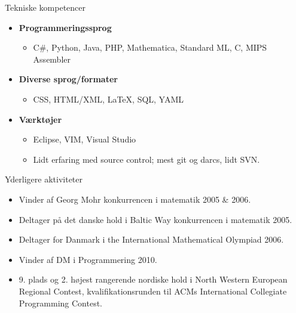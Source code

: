 \documentclass[11pt,oneside,a4paper]{article}
\newenvironment{ressection}[1]{
	\vspace{4pt}
	{\fontfamily{phv}\selectfont\Large#1}
	\begin{itemize}
	\vspace{3pt}
}{
	\end{itemize}
}
\newcommand{\resitem}[1]{
	\vspace{-4pt}
	\item \begin{flushleft} #1 \end{flushleft}
}
\newenvironment{reslist}[1]{
	\resitem{\textbf{#1}}
	\vspace{-5pt}
	\begin{itemize}
}{
	\end{itemize}
}
\begin{document}

\begin{ressection}{Tekniske kompetencer}
	\begin{reslist}{Programmeringssprog}
		\resitem{C\#, Python, Java, PHP, Mathematica, Standard ML, C, MIPS Assembler}
	\end{reslist}
	
	\begin{reslist}{Diverse sprog/formater}
		\resitem{CSS, HTML/XML, \LaTeX, SQL, YAML}
	\end{reslist}
	
	\begin{reslist}{Værktøjer}
		\resitem{Eclipse, VIM, Visual Studio}
		\resitem{Lidt erfaring med source control; mest git og darcs, lidt SVN.}
	\end{reslist}
\end{ressection}


\begin{ressection}{Yderligere aktiviteter}

	\resitem{Vinder af Georg Mohr konkurrencen i matematik 2005 \& 2006.}
	
	\resitem{Deltager på det danske hold i Baltic Way konkurrencen i matematik 2005.}
	
	\resitem{Deltager for Danmark i the International Mathematical Olympiad 2006.}

    \resitem{Vinder af DM i Programmering 2010.}

    \resitem{9. plads og 2. højest rangerende nordiske hold i North Western European Regional Contest,
             kvalifikationsrunden til ACMs International Collegiate Programming Contest.}

\end{ressection}
\end{document}
